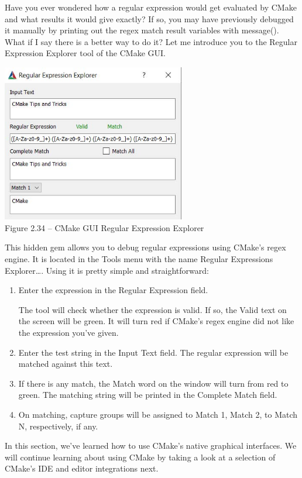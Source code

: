 
Have you ever wondered how a regular expression would get evaluated by CMake and what results it would give exactly? If so, you may have previously debugged it manually by printing out the regex match result variables with message(). What if I say there is a better way to do it? Let me introduce you to the Regular Expression Explorer tool of the CMake GUI.

\begin{center}
\includegraphics[width=0.6\textwidth]{content/1/chapter2/images/34.jpg}\\
Figure 2.34 – CMake GUI Regular Expression Explorer
\end{center}

This hidden gem allows you to debug regular expressions using CMake's regex engine. It is located in the Tools menu with the name Regular Expressions Explorer…. Using it is pretty simple and straightforward:

\begin{enumerate}
\item 
Enter the expression in the Regular Expression field.

The tool will check whether the expression is valid. If so, the Valid text on the screen will be green. It will turn red if CMake's regex engine did not like the expression you've given.

\item 
Enter the test string in the Input Text field. The regular expression will be matched against this text.

\item 
If there is any match, the Match word on the window will turn from red to green. The matching string will be printed in the Complete Match field.

\item 
On matching, capture groups will be assigned to Match 1, Match 2, to Match N, respectively, if any.
\end{enumerate}

In this section, we've learned how to use CMake's native graphical interfaces. We will continue learning about using CMake by taking a look at a selection of CMake's IDE and editor integrations next.
